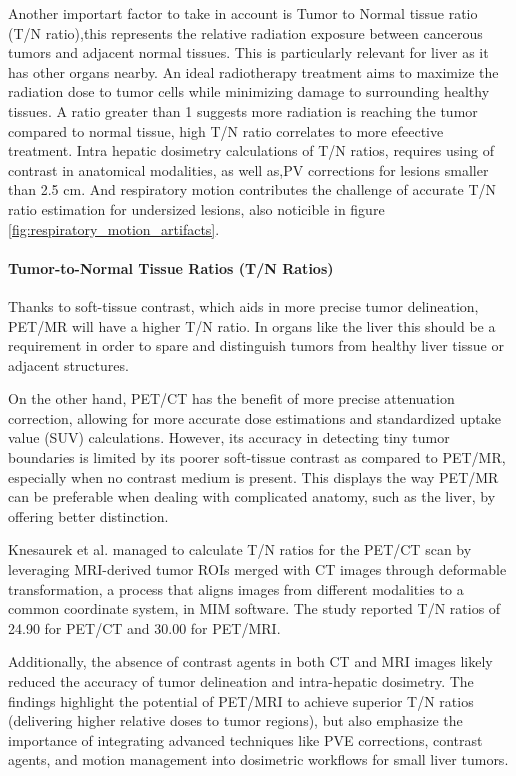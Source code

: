 Another importart factor to take in account is Tumor to Normal tissue ratio (T/N ratio),this represents the relative radiation exposure between cancerous tumors and adjacent normal tissues. This is particularly relevant for liver as it has other organs nearby. An ideal radiotherapy treatment aims to maximize the radiation dose to tumor cells while minimizing damage to surrounding healthy tissues. A ratio greater than 1 suggests more radiation is reaching the tumor compared to normal tissue, high T/N ratio correlates to more efeective treatment. Intra hepatic dosimetry calculations of T/N ratios, requires using of contrast in anatomical modalities, as well as,PV corrections for lesions smaller than 2.5 $\text{cm}$. And respiratory motion contributes the challenge of accurate T/N ratio estimation for undersized lesions, also noticible in figure \ref{fig:respiratory_motion_artifacts}.

\paragraph{Tumor-to-Normal Tissue Ratios (T/N Ratios)}

Thanks to soft-tissue contrast, which aids in more precise tumor delineation, PET/MR will have a higher T/N ratio. In organs like the liver this should be a requirement in order to spare and distinguish tumors from healthy liver tissue or adjacent structures.


On the other hand, PET/CT has the benefit of more precise attenuation correction, allowing for more accurate dose estimations and standardized uptake value (SUV) calculations. However, its accuracy in detecting tiny tumor boundaries is limited by its poorer soft-tissue contrast as compared to PET/MR, especially when no contrast medium is present. This displays the way PET/MR can be preferable when dealing with complicated anatomy, such as the liver, by offering better distinction.


Knesaurek et al. \cite{knesaurek2018} managed to calculate T/N ratios for the PET/CT scan by leveraging MRI-derived tumor ROIs merged with CT images through deformable transformation, a process that aligns images from different modalities to a common coordinate system, in MIM software. The study reported T/N ratios of 24.90 for PET/CT and 30.00 for PET/MRI. 

Additionally, the absence of contrast agents in both CT and MRI images likely reduced the accuracy of tumor delineation and intra-hepatic dosimetry. The findings highlight the potential of PET/MRI to achieve superior T/N ratios (delivering higher relative doses to tumor regions), but also emphasize the importance of integrating advanced techniques like PVE corrections, contrast agents, and motion management into dosimetric workflows for small liver tumors.

